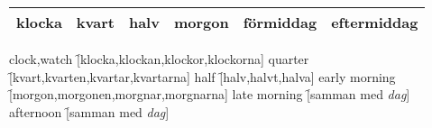 \newpage
\begin{center}
    \begin{tabular}{|c c c c c c|}
        \hline
        klocka & kvart & halv & morgon & förmiddag & eftermiddag \\
        \hline
    \end{tabular}
\end{center}

\begin{questions}
    \begin{multicols}{2}
        \raggedcolumns
        \question clock,watch \f[klocka,klockan,klockor,klockorna]
        \question quarter \f[kvart,kvarten,kvartar,kvartarna]
        \question half \f[halv,halvt,halva]
        \question early morning \f[morgon,morgonen,morgnar,morgnarna]
        \question late morning \f[samman med \textit{dag}]
        \question afternoon \f[samman med \textit{dag}]
    \end{multicols}
\end{questions}
